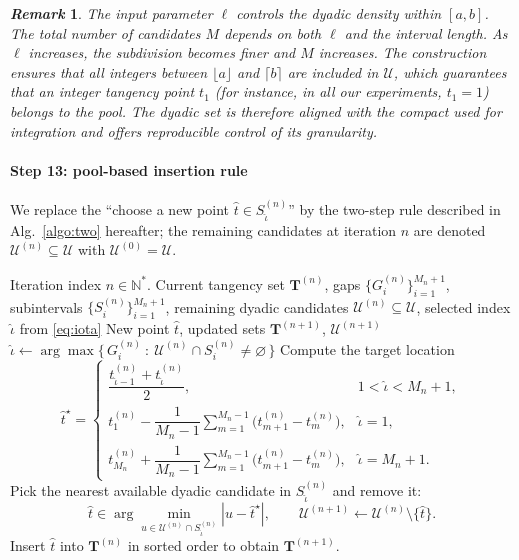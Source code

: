 \documentclass[review]{elsarticle}
\newtheorem{remark}{\em Remark}
\begin{document}
\begin{remark}
The input parameter $\ell$ controls the dyadic density within $[a,b]$. The total number of candidates $M$ depends on both $\ell$ and the interval length. As $\ell$ increases, the subdivision becomes finer and $M$ increases. The construction ensures that all integers between $\lfloor a \rfloor$ and $\lceil b \rceil$ are included in $\mathcal U$, which guarantees that an integer tangency point $t_1$ (for instance, in all our experiments, $t_1=1$) belongs to the pool. The dyadic set is therefore aligned with the compact used for integration and offers reproducible control of its granularity.
\end{remark}

\paragraph{Step 13: pool-based insertion rule}
We replace the “choose a new point $\hat t\in S_{\hat\iota}^{(n)}$” by the two-step rule described in Alg.~\ref{algo:two} hereafter; the remaining candidates at iteration $n$ are denoted $\mathcal U^{(n)}\subseteq\mathcal U$ with $\mathcal U^{(0)}=\mathcal U$.

\begin{algorithm}[H]
\caption{Decision rule with dyadic nearest-candidate (without replacement)}
\label{algo:two}
\begin{algorithmic}
\Require Iteration index $n \in \mathbb{N}^*$. Current tangency set $\mathbf{T}^{(n)}$, gaps $\{G_i^{(n)}\}_{i=1}^{M_n+1}$, subintervals $\{S_i^{(n)}\}_{i=1}^{M_n+1}$, remaining dyadic candidates $\mathcal{U}^{(n)}\subseteq\mathcal{U}$, selected index $\hat\iota$ from \eqref{eq:iota}
\Ensure New point $\hat t$, updated sets $\mathbf{T}^{(n+1)}$, $\mathcal{U}^{(n+1)}$
 \State \Return {} \EndIf
{}
    \State $\hat\iota \gets \displaystyle \arg\max\bigl\{\,G_i^{(n)}\ :\ \mathcal{U}^{(n)}\cap S_i^{(n)}\neq\varnothing\,\bigr\}$
     \State \Return {} \EndIf
\EndIf
\State Compute the target location
$$
\hat{t}^{\star}=
\begin{cases}
\dfrac{t_{\hat{\iota}-1}^{(n)}+t_{\hat{\iota}}^{(n)}}{2}, & 1<\hat{\iota}<M_n+1,\\[0.35cm]
t_1^{(n)}-\dfrac{1}{M_n-1}\sum_{m=1}^{M_n-1}\bigl(t_{m+1}^{(n)}-t_m^{(n)}\bigr), & \hat{\iota}=1,\\[0.45cm]
t_{M_n}^{(n)}+\dfrac{1}{M_n-1}\sum_{m=1}^{M_n-1}\bigl(t_{m+1}^{(n)}-t_m^{(n)}\bigr), & \hat{\iota}=M_n+1.
\end{cases}
$$
\State Pick the nearest available dyadic candidate in $S_{\hat\iota}^{(n)}$ and remove it:
$$
\hat t \in \arg\min_{u\in \mathcal{U}^{(n)}\cap S_{\hat\iota}^{(n)}} |u-\hat t^{\star}|,
\qquad
\mathcal{U}^{(n+1)} \gets \mathcal{U}^{(n)}\setminus\{\hat t\}.
$$
\State Insert $\hat t$ into $\mathbf{T}^{(n)}$ in sorted order to obtain $\mathbf{T}^{(n+1)}$.
\end{algorithmic}
\end{algorithm}
\end{document}
